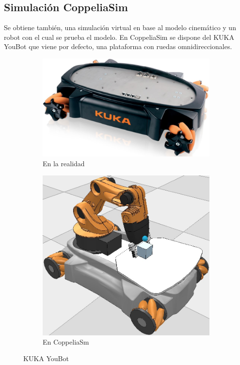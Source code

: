\documentclass[conference]{IEEEtran}
\begin{document}
\subsection{Simulación CoppeliaSim}
Se obtiene también, una simulación virtual en base al modelo cinemático y un robot con el cual se prueba el modelo.
En CoppeliaSim se dispone del KUKA YouBot que viene por defecto, una plataforma con ruedas omnidireccionales.
\begin{figure}
  \centering
  \begin{subfigure}[b]{0.5\linewidth}
    \centering
    \includegraphics[width=\linewidth]{figures/kuka_real_youbot.jpg}
    \caption{En la realidad}
    \label{fig:kukayoubot}
  \end{subfigure}
  
  \begin{subfigure}[b]{0.5\linewidth}
    \centering
    \includegraphics[width=\linewidth]{figures/kuka_sim_youbot.jpg}
    \caption{En CoppeliaSm}
    \label{fig:kukasimyoubot}
  \end{subfigure}
  \caption{KUKA YouBot}
\end{figure}
\end{document}
